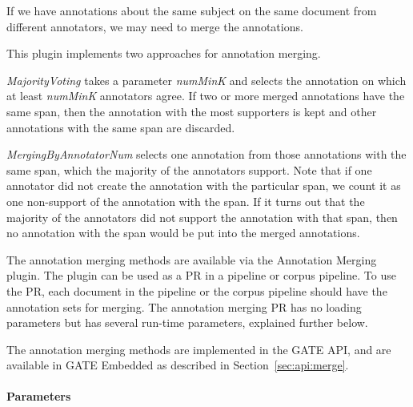 If we have annotations about the same subject on the same document from
different annotators, we may need to merge the annotations.

This plugin implements two approaches for annotation merging.

{\em MajorityVoting} takes a parameter {\em numMinK} and selects the
annotation on which at least {\em numMinK} annotators agree. If two or more
merged annotations have the same span, then the annotation with the most
supporters is kept and other annotations with the same span are discarded.

{\em MergingByAnnotatorNum} selects one annotation from those annotations with
the same span, which the majority of the annotators support. Note that if one
annotator did not create the annotation with the particular span, we count it
as one non-support of the annotation with the span. If it turns out that the
majority of the annotators did not support the annotation with that span, then
no annotation with the span would be put into the merged annotations.

The annotation merging methods are available via the Annotation Merging
plugin. The plugin can be used as a PR in a pipeline or corpus pipeline. To
use the PR, each document in the pipeline or the corpus pipeline should have
the annotation sets for merging. The annotation merging PR has no loading
parameters but has several run-time parameters, explained further below.

The annotation merging methods are implemented in the GATE API, and are
available in GATE Embedded as described in Section~\ref{sec:api:merge}.

\paragraph{Parameters}

